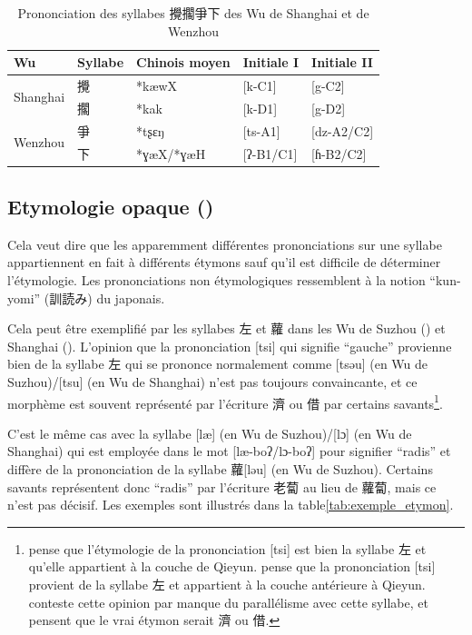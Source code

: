\documentclass{scrbook}
\newcounter{c}[subsubsection]
\newcommand{\illustre}{Les exemples sont illustrés dans la table\xspace}
\begin{document}
\begin{sloppypar}
\begin{table}[htbp]
  \centering
    \begin{tabular}{lllll}
    \toprule
    Wu    & Syllabe & Chinois moyen  & Initiale I & Initiale II \\
    \midrule
    \multirow{2}[2]{*}{Shanghai} & 攪     & *kæwX & [k-C1] & [g-C2]     \\
          & 擱     & *kak  & [k-D1] & [g-D2] \\
    \midrule
    \multirow{2}[2]{*}{Wenzhou} & 爭     & *tʂɛŋ & [ts-A1] & [dz-A2/C2] \\
          & 下     & *ɣæX/*ɣæH & [ʔ-B1/C1] & [ɦ-B2/C2] \\
    \bottomrule
    \end{tabular}%
  \caption{Prononciation des syllabes 攪擱爭下 des Wu de Shanghai et de Wenzhou}
  \label{tab:exemple_morpho3}%
\end{table}%

\subsection{Etymologie opaque (\cite[138]{Shen1988shanghai})}\label{phenom2}
Cela veut dire que les apparemment différentes prononciations sur une syllabe appartiennent en fait à différents étymons sauf qu'il est difficile de déterminer l'étymologie. Les prononciations non étymologiques ressemblent à la notion ``kun-yomi'' (訓読み) du japonais.

Cela peut être exemplifié par les syllabes 左 et 蘿 dans les Wu de Suzhou (\cite[26]{Ye1988suzhou}) et Shanghai (\cite[133, 138]{Shen1988shanghai}). L'opinion que la prononciation [tsi] qui signifie ``gauche'' provienne bien de la syllabe 左 qui se prononce normalement comme [tsəu] (en Wu de Suzhou)/[tsu] (en Wu de Shanghai) n'est pas toujours convaincante, et ce morphème est souvent représenté par l'écriture 濟 ou 借 par certains savants\footnote{\textcite[291--292]{Wang2003benzi} pense que l'étymologie de la prononciation [tsi] est bien la syllabe 左 et qu'elle appartient à la couche de Qieyun. \textcite{Zheng2009guo_wu} pense que la prononciation [tsi] provient de la syllabe 左 et appartient à la couche antérieure à Qieyun. \textcite{Wang2015zuo_wu} conteste cette opinion par manque du parallélisme avec cette syllabe, et pensent que le vrai étymon serait 濟 ou 借.}. 

C'est le même cas avec la syllabe [læ] (en Wu de Suzhou)/[lɔ] (en Wu de Shanghai) qui est employée dans le mot [læ-boʔ/lɔ-boʔ] pour signifier ``radis'' et diffère de la prononciation de la syllabe 蘿[ləu] (en Wu de Suzhou). Certains savants représentent donc ``radis'' par l'écriture 老蔔 au lieu de 蘿蔔, mais ce n'est pas décisif. \illustre \ref{tab:exemple_etymon}.


\end{sloppypar}
\end{document}
